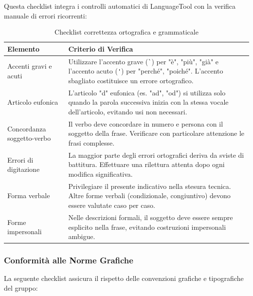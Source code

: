 \documentclass[a4paper,11pt,oneside]{scrartcl}
\begin{document}
Questa checklist integra i controlli automatici di LanguageTool con la verifica manuale di errori ricorrenti:

\begin{table}[H]
\centering
\renewcommand{\arraystretch}{1.4}
\begin{tabularx}{\textwidth}{@{}p{}X@{}}
\toprule
\textbf{Elemento} & \textbf{Criterio di Verifica} \\
\midrule
Accenti gravi e acuti & Utilizzare l'accento grave (\texttt{\`{}}) per "è", "più", "già" e l'accento acuto (\texttt{\'{}}) per "perché", "poiché". L'accento sbagliato costituisce un errore ortografico. \\
\midrule
Articolo eufonica & L'articolo "d" eufonica (es. "ad", "od") si utilizza solo quando la parola successiva inizia con la stessa vocale dell'articolo, evitando usi non necessari. \\
\midrule
Concordanza soggetto-verbo & Il verbo deve concordare in numero e persona con il soggetto della frase. Verificare con particolare attenzione le frasi complesse. \\
\midrule
Errori di digitazione & La maggior parte degli errori ortografici deriva da sviste di battitura. Effettuare una rilettura attenta dopo ogni modifica significativa. \\
\midrule
Forma verbale & Privilegiare il presente indicativo nella stesura tecnica. Altre forme verbali (condizionale, congiuntivo) devono essere valutate caso per caso. \\
\midrule
Forme impersonali & Nelle descrizioni formali, il soggetto deve essere sempre esplicito nella frase, evitando costruzioni impersonali ambigue. \\
\bottomrule
\end{tabularx}
\caption{Checklist correttezza ortografica e grammaticale}
\end{table}

\subsubsection{Conformità alle Norme Grafiche}

La seguente checklist assicura il rispetto delle convenzioni grafiche e tipografiche del gruppo:
\end{document}
